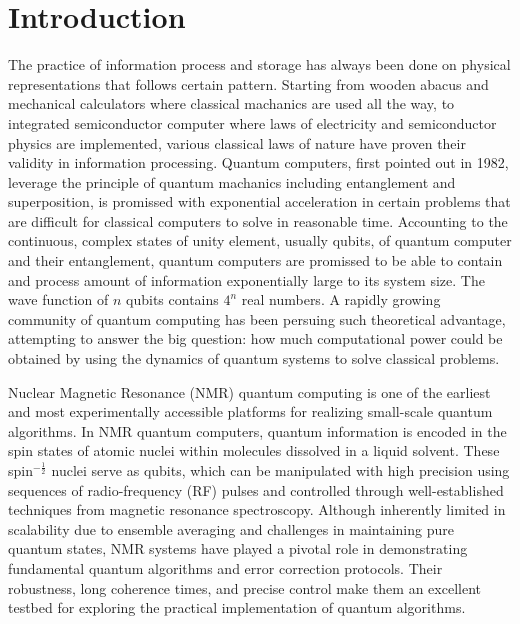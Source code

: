 \documentclass[%
 reprint,
 amsmath,amssymb,
 aps,
]{revtex4-2}
\begin{document}
\section{Introduction}
The practice of information process and storage has always been done on physical representations that follows certain pattern. Starting from wooden abacus and mechanical calculators where classical machanics are used all the way, to integrated semiconductor computer where laws of electricity and semiconductor physics are implemented, various classical laws of nature have proven their validity in information processing. Quantum computers, first pointed out in 1982\cite{feynman1982simulating}, leverage the principle of quantum machanics including entanglement and superposition, is promissed with exponential acceleration in certain problems that are difficult for classical computers to solve in reasonable time. Accounting to the continuous, complex states of unity element, usually qubits, of quantum computer and their entanglement, quantum computers are promissed to be able to contain and process amount of information exponentially large to its system size. The wave function of $n$ qubits contains $4^n$ real numbers. A rapidly growing community of quantum computing has been persuing such theoretical advantage, attempting to answer the big question: how much computational power could be obtained by using the dynamics of quantum systems to solve classical problems.

Nuclear Magnetic Resonance (NMR) quantum computing is one of the earliest and most experimentally accessible platforms for realizing small-scale quantum algorithms. In NMR quantum computers, quantum information is encoded in the spin states of atomic nuclei within molecules dissolved in a liquid solvent. These spin${}^{-\frac{1}{2}}$ nuclei serve as qubits, which can be manipulated with high precision using sequences of radio-frequency (RF) pulses and controlled through well-established techniques from magnetic resonance spectroscopy. Although inherently limited in scalability due to ensemble averaging and challenges in maintaining pure quantum states, NMR systems have played a pivotal role in demonstrating fundamental quantum algorithms and error correction protocols. Their robustness, long coherence times, and precise control make them an excellent testbed for exploring the practical implementation of quantum algorithms.
\end{document}

